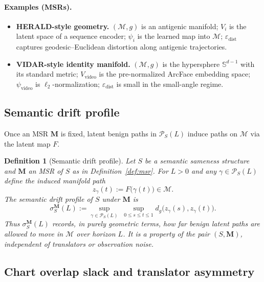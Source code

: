 \documentclass[11pt]{article}
\newtheorem{definition}{Definition}
\begin{document}
\paragraph{Examples (MSRs).}
\begin{itemize}[leftmargin=*]
\item \textbf{HERALD-style geometry.} $(\mathcal{M}, g)$ is an antigenic manifold; $V_i$
is the latent space of a sequence encoder; $\psi_i$ is the learned map into $\mathcal{M}$;
$\varepsilon_{\mathrm{dist}}$ captures geodesic--Euclidean distortion along antigenic trajectories.

\item \textbf{VIDAR-style identity manifold.} $(\mathcal{M}, g)$ is the hypersphere
$\mathbb{S}^{d-1}$ with its standard metric; $V_{\mathrm{video}}$ is the pre-normalized
ArcFace embedding space; $\psi_{\mathrm{video}}$ is $\ell_2$-normalization; $\varepsilon_{\mathrm{dist}}$
is small in the small-angle regime.
\end{itemize}

\subsection{Semantic drift profile}
\label{subsec:semantic-drift}

Once an MSR $\mathbf{M}$ is fixed, latent benign paths in $\mathcal{P}_S(L)$ induce paths on
$\mathcal{M}$ via the latent map $F$.

\begin{definition}[Semantic drift profile]
\label{def:semantic-drift}
Let $S$ be a semantic sameness structure and $\mathbf{M}$ an MSR of $S$ as in
Definition~\ref{def:msr}. For $L>0$ and any $\gamma\in\mathcal{P}_S(L)$ define the induced
manifold path
\[
z_\gamma(t) := F\bigl(\gamma(t)\bigr) \in \mathcal{M}.
\]
The \emph{semantic drift profile} of $S$ under $\mathbf{M}$ is
\[
\sigma_S^{\mathbf{M}}(L)
:=
\sup_{\gamma\in\mathcal{P}_S(L)}\;
\sup_{0\le s\le t\le 1}
d_g\bigl(z_\gamma(s), z_\gamma(t)\bigr).
\]
Thus $\sigma_S^{\mathbf{M}}(L)$ records, in purely geometric terms, how far benign latent
paths are allowed to move in $\mathcal{M}$ over horizon $L$. It is a property of the pair
$(S,\mathbf{M})$, independent of translators or observation noise.
\end{definition}

\subsection{Chart overlap slack and translator asymmetry}
\label{subsec:chart-asymm}
\end{document}
